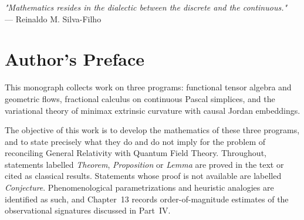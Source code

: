 \documentclass[11pt,a4paper,openright,twoside]{book}
\begin{document}
\vspace{1.5cm}

\begin{flushright}
\textit{"Mathematics resides in the dialectic between the discrete and the continuous."} \\
\vspace{0.2cm}
--- Reinaldo M. Silva-Filho
\end{flushright}
\vfill
\clearpage

\chapter*{Author's Preface}
This monograph collects work on three programs: functional tensor algebra and geometric flows, fractional calculus on continuous Pascal simplices, and the variational theory of minimax extrinsic curvature with causal Jordan embeddings.

The objective of this work is to develop the mathematics of these three programs, and to state precisely what they do and do not imply for the problem of reconciling General Relativity with Quantum Field Theory. Throughout, statements labelled \emph{Theorem}, \emph{Proposition} or \emph{Lemma} are proved in the text or cited as classical results. Statements whose proof is not available are labelled \emph{Conjecture}. Phenomenological parametrizations and heuristic analogies are identified as such, and Chapter~13 records order-of-magnitude estimates of the observational signatures discussed in Part~IV.
\end{document}

